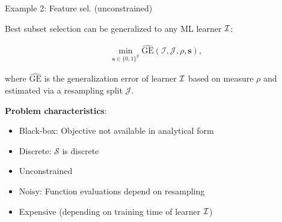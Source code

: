 

	
\begin{vbframe}{Example 2: Feature sel. (unconstrained)}

Best subset selection can be generalized to any ML learner $\mathcal{I}$:

\begin{eqnarray*}
	\min_{\textbf{s} \in \{0, 1\}^p} \widehat{\text{GE}}(\mathcal{I}, \mathcal{J}, \rho, \bm{s}),
\end{eqnarray*}

where $\widehat{\text{GE}}$ is the generalization error of learner $\mathcal{I}$ based on measure $\rho$ and estimated via a resampling split $\mathcal{J}$. 

\lz 

\textbf{Problem characteristics}:
\begin{itemize}
	\item Black-box: Objective not available in analytical form
	\item Discrete: $\mathcal{S}$ is discrete
	\item Unconstrained
	\item Noisy: Function evaluations depend on resampling
	\item Expensive (depending on training time of learner $\mathcal{I}$)
\end{itemize}

\end{vbframe}

